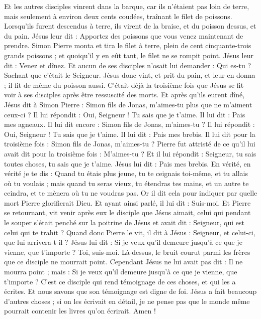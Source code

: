 \begin{multicols}{2}
Et les autres disciples vinrent dans la barque, car ils n'étaient pas loin de terre, mais seulement à environ deux cents coudées, traînant le filet de poissons.
Lorsqu'ils furent descendus à terre, ils virent de la braise, et du poisson dessus, et du pain.
Jésus leur dit : Apportez des poissons que vous venez maintenant de prendre.
Simon Pierre monta et tira le filet à terre, plein de cent cinquante-trois grands poissons ; et quoiqu'il y en eût tant, le filet ne se rompit point.
Jésus leur dit : Venez et dînez. Et aucun de ses disciples n'osait lui demander : Qui es-tu ? Sachant que c'était le Seigneur.
Jésus donc vint, et prit du pain, et leur en donna ; il fit de même du poisson aussi.
C'était déjà la troisième fois que Jésus se fit voir à ses disciples après être ressuscité des morts.
Et après qu'ils eurent dîné, Jésus dit à Simon Pierre : Simon fils de Jonas, m'aimes-tu plus que ne m'aiment ceux-ci ? Il lui répondit : Oui, Seigneur ! Tu sais que je t'aime. Il lui dit : Pais mes agneaux.
Il lui dit encore : Simon fils de Jonas, m'aimes-tu ? Il lui répondit : Oui, Seigneur ! Tu sais que je t'aime. Il lui dit : Pais mes brebis.
Il lui dit pour la troisième fois : Simon fils de Jonas, m'aimes-tu ? Pierre fut attristé de ce qu'il lui avait dit pour la troisième fois : M'aimes-tu ? Et il lui répondit : Seigneur, tu sais toutes choses, tu sais que je t'aime. Jésus lui dit : Pais mes brebis.
En vérité, en vérité je te dis : Quand tu étais plus jeune, tu te ceignais toi-même, et tu allais où tu voulais ; mais quand tu seras vieux, tu étendras tes mains, et un autre te ceindra, et te mènera où tu ne voudras pas.
Or il dit cela pour indiquer par quelle mort Pierre glorifierait Dieu. Et ayant ainsi parlé, il lui dit : Suis-moi.
Et Pierre se retournant, vit venir après eux le disciple que Jésus aimait, celui qui pendant le souper s'était penché sur la poitrine de Jésus et avait dit : Seigneur, qui est celui qui te trahit ?
Quand donc Pierre le vit, il dit à Jésus : Seigneur, et celui-ci, que lui arrivera-t-il ?
Jésus lui dit : Si je veux qu'il demeure jusqu'à ce que je vienne, que t'importe ? Toi, suis-moi.
Là-dessus, le bruit courut parmi les frères que ce disciple ne mourrait point. Cependant Jésus ne lui avait pas dit : Il ne mourra point ; mais : Si je veux qu'il demeure jusqu'à ce que je vienne, que t'importe ?
C'est ce disciple qui rend témoignage de ces choses, et qui les a écrites. Et nous savons que son témoignage est digne de foi.
Jésus a fait beaucoup d'autres choses ; si on les écrivait en détail, je ne pense pas que le monde même pourrait contenir les livres qu'on écrirait. Amen !
\PPE{}
\end{multicols}
